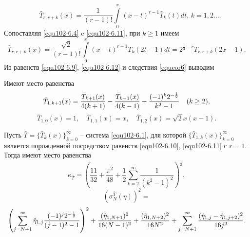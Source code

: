   \begin{equation}\label{equ102-6.11}
\quad \bar T_{r,r+k}(x) =\frac{1}{(r-1)!}\int\limits_{0}^x(x-t)^{r-1}\bar T_k(t)dt, \, k=1,2\ldots.
\end{equation}
Сопоставляя \eqref{equ102-6.4} c \eqref{equ102-6.11}, при $k\ge1$ имеем
\begin{equation}\label{equ102-6.12}
\bar T_{r,r+k}(x) =\frac{\sqrt{2}}{(r-1)!}\int\limits_{0}^x(x-t)^{r-1}T_k(2t-1)dt=2^{\frac12-r}T_{r,r+k}(2x-1).
\end{equation}
Из равенств  \eqref{equ102-6.9}, \eqref{equ102-6.12} и следствия \ref{equcor6} выводим
\begin{corollary} Имеют место равенства
\begin{equation}\label{equ102-6.13}
\bar T_{1,k+1}(x)={\bar T_{k+1}(x)\over4(k+1)}- {\bar T_{k-1}(x)\over4(k-1)} -\frac{(-1)^k2^{-\frac12}}{k^2-1}\quad (k\ge 2),
\end{equation}
\begin{equation}\label{equ102-6.14}
\bar T_{1,0}(x)=1, \quad \bar T_{1,1}(x)=x, \quad \bar T_{1,2}(x)=\sqrt{2}x(x-1).
\end{equation}
\end{corollary}
\begin{theorem}\label{equtheo7}
  Пусть $\bar T=\{\bar T_k(x)\}_{k=0}^\infty$ -- система  \eqref{equ102-6.1}, для которой  $\{\bar T_{1,k}(x)\}_{k=0}^\infty$  является порожденной посредством равенств \eqref{equ102-6.10}, \eqref{equ102-6.11} с $r=1$. Тогда   имеют место равенства
 $$
\kappa_{\bar T}=\left(\frac{11}{32}+\frac{\pi^2}{48}+\frac12\sum_{k=2}^\infty\frac{1}{(k^2-1)^2}\right)^\frac12,
$$
$$
(\sigma^{\bar T}_N(\eta))^2=
$$
$$
\left(\sum_{j=N+1}^{\infty}\hat\eta_{1,j}\frac{(-1)^j2^{-\frac12}}{(j-1)^2-1}\right)^2+
{(\hat\eta_{1,N+1})^2\over16(N-1)^2} +{(\hat\eta_{1,N+2})^2\over16N^2}
+\sum_{j=N+1}^{\infty}\frac{(\hat\eta_{1,j}-\hat\eta_{1,j+2})^2}{16j^2}.
$$
\end{theorem}
